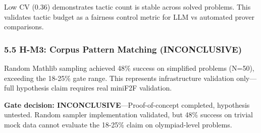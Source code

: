 \begin{table}[htbp]
\centering
{}
\end{table}

Low CV (0.36) demonstrates tactic count is stable across solved problems. This validates tactic budget as a fairness control metric for LLM vs automated prover comparisons.

\subsubsection{5.5 H-M3: Corpus Pattern Matching (INCONCLUSIVE)}

Random Mathlib sampling achieved 48\% success on simplified problems (N=50), exceeding the 18-25\% gate range. This represents infrastructure validation only---full hypothesis claim requires real miniF2F validation.

\textbf{Gate decision: INCONCLUSIVE}---Proof-of-concept completed, hypothesis untested. Random sampler implementation validated, but 48\% success on trivial mock data cannot evaluate the 18-25\% claim on olympiad-level problems.

\begin{table}[htbp]
\centering
{}
\end{table}

